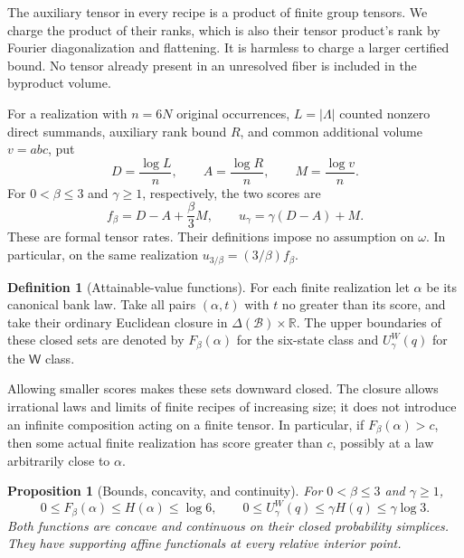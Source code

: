 \documentclass[11pt]{article}
\numberwithin{equation}{section}
\newtheorem{proposition}[theorem]{Proposition}
\theoremstyle{definition}
\newtheorem{definition}[theorem]{Definition}
\theoremstyle{remark}
\begin{document}
The auxiliary tensor in every recipe is a product of finite group tensors.
We charge the product of their ranks, which is also their tensor product's
rank by Fourier diagonalization and flattening.  It is harmless to charge a
larger certified bound.  No tensor already present in an unresolved fiber is
included in the byproduct volume.

For a realization with $n=6N$ original occurrences, $L=|\Lambda|$ counted
nonzero direct summands, auxiliary rank bound $R$, and common additional
volume $v=abc$, put
\begin{equation}
 D=\frac{\log L}{n},\qquad
 A=\frac{\log R}{n},\qquad
 M=\frac{\log v}{n}.
\label{val:rates}
\end{equation}
For $0<\beta\le3$ and $\gamma\ge1$, respectively, the two scores are
\begin{equation}
 f_\beta=D-A+\frac\beta3M,
 \qquad
 u_\gamma=\gamma(D-A)+M.
\label{val:scores}
\end{equation}
These are formal tensor rates.  Their definitions impose no assumption on
$\omega$.  In particular, on the same realization
$u_{3/\beta}=(3/\beta)f_\beta$.

\begin{definition}[Attainable-value functions]
\label{val:def-value}
For each finite realization let $\alpha$ be its canonical bank law.  Take all
pairs $(\alpha,t)$ with $t$ no greater than its score, and take their ordinary
Euclidean closure in $\Delta(\mathcal B)\times\mathbb R$.  The upper boundaries of
these closed sets are denoted by $F_\beta(\alpha)$ for the six-state class
and $U^W_\gamma(q)$ for the $\mathsf W$ class.
\end{definition}

Allowing smaller scores makes these sets downward closed.  The closure allows
irrational laws and limits of finite recipes of increasing size; it does not
introduce an infinite composition acting on a finite tensor.  In particular,
if $F_\beta(\alpha)>c$, then some actual finite realization has score greater
than $c$, possibly at a law arbitrarily close to $\alpha$.

\begin{proposition}[Bounds, concavity, and continuity]
\label{prop:values}
For $0<\beta\le3$ and $\gamma\ge1$,
\begin{equation}
 0\le F_\beta(\alpha)\le H(\alpha)\le\log6,
 \qquad
 0\le U^W_\gamma(q)\le\gamma H(q)\le\gamma\log3.
\label{val:entropy-cap}
\end{equation}
Both functions are concave and continuous on their closed probability
simplices.  They have supporting affine functionals at every relative
interior point.
\end{proposition}
\end{document}
